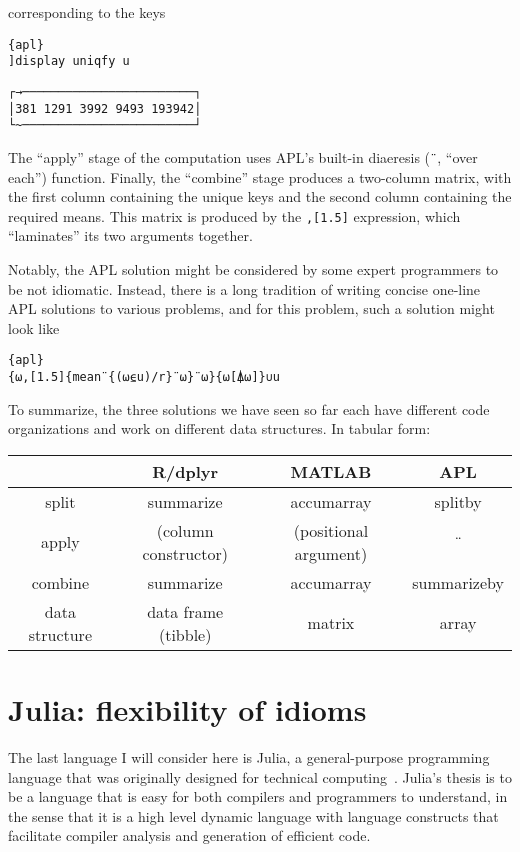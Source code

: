 \documentclass[11pt]{asaproc}
\begin{document}
corresponding to the keys

\begin{lstlisting}{apl}
]display uniqfy u
\end{lstlisting}
\begin{verbatim}
┌→────────────────────────┐
│381 1291 3992 9493 193942│
└~────────────────────────┘
\end{verbatim}

The ``apply'' stage of the computation uses APL's built-in diaeresis
(\lstinline|¨|, ``over each'') function. Finally, the ``combine'' stage
produces a two-column matrix, with the first column containing the unique keys
and the second column containing the required means. This matrix is produced by
the \lstinline|,[1.5]| expression, which ``laminates'' its two arguments
together.

Notably, the APL solution might be considered by some expert programmers to be
not idiomatic. Instead, there is a long tradition of writing concise one-line
APL solutions to various problems, and for this problem, such a solution might
look like

\begin{lstlisting}{apl}
{⍵,[1.5]{mean¨{(⍵⍷u)/r}¨⍵}¨⍵}{⍵[⍋⍵]}∪u
\end{lstlisting}

To summarize, the three solutions we have seen so far each have different code
organizations and work on different data structures. In tabular form:

\begin{tabular}{c|ccc}
 & R/dplyr & MATLAB & APL\tabularnewline
\hline
split & summarize & accumarray & splitby\tabularnewline
apply & (column constructor) & (positional argument) & ¨\tabularnewline
combine & summarize & accumarray & summarizeby\tabularnewline
data structure & data frame (tibble) & matrix & array\tabularnewline
\end{tabular}


\section{Julia: flexibility of idioms}

The last language I will consider here is Julia, a general-purpose programming
language that was originally designed for technical
computing~\citep{Bezanson2015}.  Julia's thesis is to be a language that is
easy for both compilers and programmers to understand, in the sense that it is
a high level dynamic language with language constructs that facilitate compiler
analysis and generation of efficient code.
\end{document}
